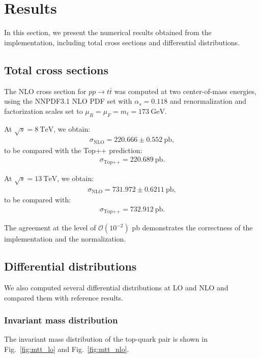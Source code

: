 \section{Results}

In this section, we present the numerical results obtained from the
implementation, including total cross sections and differential
distributions.

\subsection{Total cross sections}

The NLO cross section for $pp \to t\bar{t}$ was computed at two
center-of-mass energies, using the NNPDF3.1 NLO PDF set with
$\alpha_s = 0.118$ and renormalization and factorization scales
set to $\mu_R = \mu_F = m_t = 173~\text{GeV}$.

At $\sqrt{s} = 8~\text{TeV}$, we obtain:
\begin{align}
\sigma_{\text{NLO}} = 220.666 \pm 0.552~\text{pb},
\end{align}
to be compared with the Top++ prediction:
\begin{align}
\sigma_{\text{Top++}} = 220.689~\text{pb}.
\end{align}

At $\sqrt{s} = 13~\text{TeV}$, we obtain:
\begin{align}
\sigma_{\text{NLO}} = 731.972 \pm 0.6211~\text{pb},
\end{align}
to be compared with:
\begin{align}
\sigma_{\text{Top++}} = 732.912~\text{pb}.
\end{align}

The agreement at the level of $\mathcal{O}(10^{-2})$ pb demonstrates
the correctness of the implementation and the normalization.

\subsection{Differential distributions}

We also computed several differential distributions at LO and NLO
and compared them with reference results.

\subsubsection{Invariant mass distribution}

The invariant mass distribution of the top-quark pair is shown in
Fig.~\ref{fig:mtt_lo} and Fig.~\ref{fig:mtt_nlo}.

